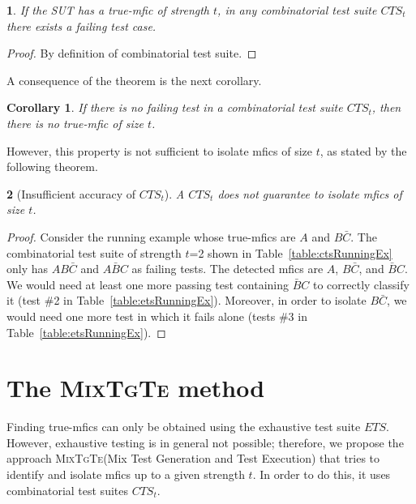 \documentclass[
12pt, %
oneside, %
english, %
singlespacing, %
headsepline, %
consistentlayout, %
]{MastersDoctoralThesis} %
\newcommand{\mix}{\textsc{MixTgTe}\xspace}
\newcommand{\mfic}{\textsf{mfic}\xspace}
\newcommand{\mfics}{\textsf{mfics}\xspace}
\newcommand{\ets}{\ensuremath{\mathit{ETS}}\xspace}
\newcommand{\cts}{\ensuremath{\mathit{CTS}}\xspace}
\newtheorem{thm}{\protect\theoremname}
\providecommand{\theoremname}{Theorem}
\theoremstyle{plain}
\theoremstyle{definition}
\theoremstyle{remark}
\theoremstyle{plain}
\theoremstyle{plain}
\newtheorem{corollary}{Corollary}
\providecommand{\theoremname}{Theorem}
\theoremstyle{remark}
\begin{document}
\begin{thm}\label{thm:trueMficCTSt}
	If the SUT has a \emph{true}-\mfic of strength $t$, in any combinatorial test suite $\cts_t$ there exists a failing test case.
\end{thm}

\begin{proof}
	By definition of combinatorial test suite.
\end{proof}

A consequence of the theorem is the next corollary.

\begin{corollary}
	If there is no failing test in a combinatorial test suite $\cts_t$, then there is no true-\mfic of size $t$.
\end{corollary}

However, this property is not sufficient to isolate \mfics of size $t$, as stated by the following theorem.

\begin{thm}[Insufficient accuracy of $\cts_t$]\label{thm:insufficientAccuracyCTSt}
	A $\cts_t$ does not guarantee to isolate \mfics of size $t$.
\end{thm}

\begin{proof}
	Consider the running example whose true-\mfics are $A$ and $B\bar{C}$. The combinatorial test suite of strength $t$=2 shown in Table~\ref{table:ctsRunningEx} only has $AB\bar{C}$ and $A\bar{B}C$ as failing tests.
	The detected \mfics are $A$, $B\bar{C}$, and $\bar{B}C$. We would need at least one more passing test containing $\bar{B}C$ to correctly classify it (test \#2 in Table~\ref{table:etsRunningEx}). Moreover, in order to isolate $B\bar{C}$, we would need one more test in which it fails alone (tests \#3 in Table~\ref{table:etsRunningEx}).
\end{proof}


\section{The \mix method}\label{sec:proposedApproach}

Finding true-\mfics can only be obtained using the exhaustive test suite \ets. However, exhaustive testing is in general not possible; therefore, we propose the approach \mix (Mix Test Generation and Test Execution) that tries to identify and isolate \mfics up to a given strength $t$. In order to do this, it uses combinatorial test suites $\cts_t$.
\end{document}

